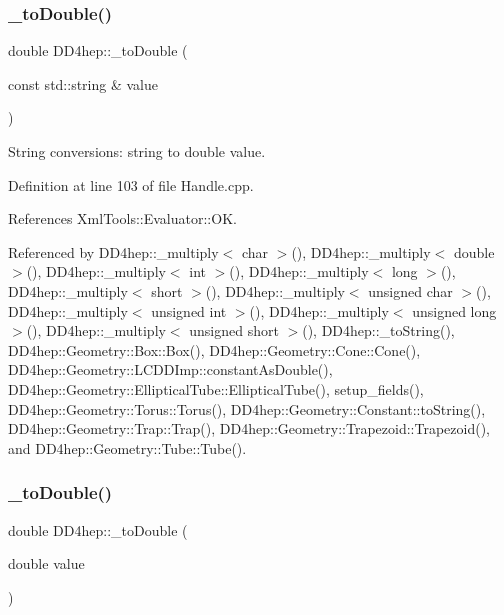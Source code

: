 \subsubsection{\texorpdfstring{\+\_\+to\+Double()}{\_toDouble()}\hspace{0.1cm}{\footnotesize\ttfamily [1/2]}}
{\footnotesize\ttfamily double D\+D4hep\+::\+\_\+to\+Double (\begin{DoxyParamCaption}\item[{const std\+::string \&}]{value }\end{DoxyParamCaption})}



String conversions\+: string to double value. 



Definition at line 103 of file Handle.\+cpp.



References Xml\+Tools\+::\+Evaluator\+::\+OK.



Referenced by D\+D4hep\+::\+\_\+multiply$<$ char $>$(), D\+D4hep\+::\+\_\+multiply$<$ double $>$(), D\+D4hep\+::\+\_\+multiply$<$ int $>$(), D\+D4hep\+::\+\_\+multiply$<$ long $>$(), D\+D4hep\+::\+\_\+multiply$<$ short $>$(), D\+D4hep\+::\+\_\+multiply$<$ unsigned char $>$(), D\+D4hep\+::\+\_\+multiply$<$ unsigned int $>$(), D\+D4hep\+::\+\_\+multiply$<$ unsigned long $>$(), D\+D4hep\+::\+\_\+multiply$<$ unsigned short $>$(), D\+D4hep\+::\+\_\+to\+String(), D\+D4hep\+::\+Geometry\+::\+Box\+::\+Box(), D\+D4hep\+::\+Geometry\+::\+Cone\+::\+Cone(), D\+D4hep\+::\+Geometry\+::\+L\+C\+D\+D\+Imp\+::constant\+As\+Double(), D\+D4hep\+::\+Geometry\+::\+Elliptical\+Tube\+::\+Elliptical\+Tube(), setup\+\_\+fields(), D\+D4hep\+::\+Geometry\+::\+Torus\+::\+Torus(), D\+D4hep\+::\+Geometry\+::\+Constant\+::to\+String(), D\+D4hep\+::\+Geometry\+::\+Trap\+::\+Trap(), D\+D4hep\+::\+Geometry\+::\+Trapezoid\+::\+Trapezoid(), and D\+D4hep\+::\+Geometry\+::\+Tube\+::\+Tube().

\hypertarget{group___d_d4_h_e_p___g_e_o_m_e_t_r_y_ga3d960b4bfc48c6c6bce83e0021da377f}{}\label{group___d_d4_h_e_p___g_e_o_m_e_t_r_y_ga3d960b4bfc48c6c6bce83e0021da377f} 
\subsubsection{\texorpdfstring{\+\_\+to\+Double()}{\_toDouble()}\hspace{0.1cm}{\footnotesize\ttfamily [2/2]}}
{\footnotesize\ttfamily double D\+D4hep\+::\+\_\+to\+Double (\begin{DoxyParamCaption}\item[{double}]{value }\end{DoxyParamCaption})\hspace{0.3cm}{\ttfamily [inline]}}



